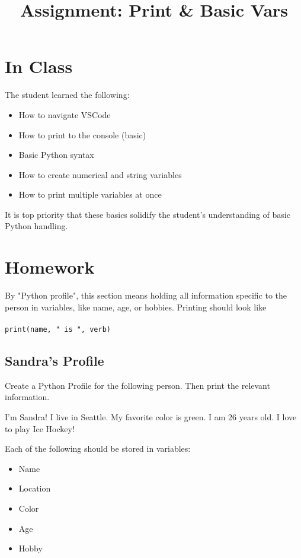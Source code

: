 \documentclass{article}
\title{\vspace{-3em}Assignment: Print \& Basic Vars\vspace{-3em}}
\begin{document}
\fontsize{14}{16}\selectfont
\maketitle
\vspace{-1em}
\section{In Class}
The student learned the following:
\begin{itemize}
    \item How to navigate VSCode
    \item How to print to the console (basic)
    \item Basic Python syntax
    \item How to create numerical and string variables
    \item How to print multiple variables at once 
\end{itemize}

It is top priority that these basics solidify the student's understanding of basic Python handling.

\section{Homework}
By "Python profile", this section means holding all information specific to the person in variables, like name, age, or hobbies. Printing should look like  \\ \\
\verb|print(name, " is ", verb)|

\subsection{Sandra's Profile}

Create a Python Profile for the following person. Then print the relevant information.

\begin{center}
    I'm Sandra! I live in Seattle. My favorite color is green. I am 26 years old. I love to play Ice Hockey!
\end{center}

Each of the following should be stored in variables:

\begin{itemize}
    \item Name
    \item Location
    \item Color
    \item Age
    \item Hobby
\end{itemize}
\end{document}
